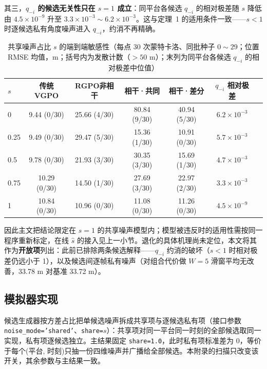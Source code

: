 \documentclass[UTF8,a4paper,zihao=-4]{ctexart}
\begin{document}
其三，\textbf{\(q_{-i}\) 的候选无关性只在 \(s=1\) 成立}：同平台各候选 \(q_{-i}\) 的相对极差随 \(s\) 降低由 \(4.5\times10^{-9}\) 升至 \(3.3\times10^{-3}\sim6.2\times10^{-3}\)。这与定理~1 的适用条件一致——\(s<1\) 时逐候选私有角度噪声进入 \(q_{-i}\)，约消不再精确。

\begin{table}[htbp]
\centering
\caption{共享噪声占比 \(s\) 的端到端敏感性（每点 30 次蒙特卡洛、同批种子 $0\sim29$；位置 RMSE 均值，m；括号内为发散计数（$>50$ m）；末列为同平台各候选 \(q_{-i}\) 的相对极差中位值）}\label{tab:s-sweep}
\small
\begin{tabular}{@{}lcccccc@{}}
\toprule
\(s\) & 传统VGPO & RGPO非相干 & 相干·共同 & 相干·差分 & \(q_{-i}\) 相对极差\\
\midrule
0    & 9.44 (0/30) & 25.66 (4/30) & 80.84 (9/30) & 40.94 (5/30) & $6.2\times10^{-3}$\\
0.25 & 9.49 (0/30) & 29.47 (5/30) & 15.36 (1/30) & 10.91 (0/30) & $5.7\times10^{-3}$\\
0.5  & 9.78 (0/30) & 21.93 (3/30) & 30.35 (3/30) & 15.69 (1/30) & $4.7\times10^{-3}$\\
0.75 & 10.29 (0/30) & 14.50 (1/30) & 27.69 (3/30) & 22.97 (2/30) & $3.3\times10^{-3}$\\
1    & 10.84 (0/30) & 10.96 (0/30) & 11.08 (0/30) & 11.26 (0/30) & $4.5\times10^{-9}$\\
\bottomrule
\end{tabular}
\end{table}

因此主文把结论限定在 \(s=1\) 的共享噪声模型内；模型被违反时的适用性需按同一程序重新标定，在线 \(\hat s\) 的接入见上一小节。退化的具体机理尚未定位，本文将其作为\textbf{开放项}列出：此前已排除两条候选解释——\(q_{-i}\) 约消的破坏（\(s<1\) 时相对极差仍远小于 1），以及候选间逐帧私有噪声（对组合代价做 $W=5$ 滑窗平均无改善，33.78 m 对基准 33.72 m）。

\subsection{模拟器实现}

候选生成器按方差占比把单候选噪声拆成共享项与逐候选私有项（接口参数 \texttt{noise\_mode='shared'}、\texttt{share=\(s\)}）：共享项对同一平台同一时刻的全部候选取同一实现，私有项逐候选独立。主结果固定 \texttt{share=1.0}，此时私有项标准差为 0，等价于每个(平台, 时刻)只抽一份四维噪声并广播给全部候选。本附录的扫描只改变该开关，其余参数与主结果一致。
\end{document}
